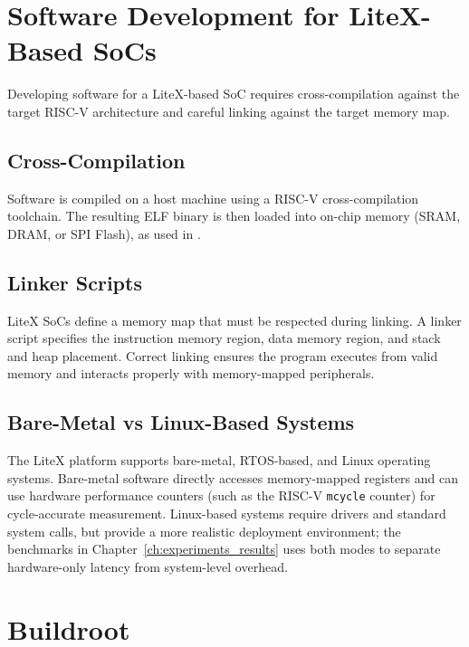 \section{Software Development for LiteX-Based SoCs}
\label{sec:sw_dev}

Developing software for a LiteX-based SoC requires cross-compilation against the
target RISC-V architecture and careful linking against the target memory map.

\subsection{Cross-Compilation}
\label{subsec:cross_compile}

Software is compiled on a host machine using a RISC-V cross-compilation toolchain.
The resulting ELF binary is then loaded into on-chip memory (SRAM, DRAM, or SPI Flash),
as used in \cite{CXUPlayground}.

\subsection{Linker Scripts}
\label{subsec:linker_scripts}

LiteX SoCs define a memory map that must be respected during linking.
A linker script specifies the instruction memory region, data memory region, and stack
and heap placement.
Correct linking ensures the program executes from valid memory and interacts properly
with memory-mapped peripherals.

\subsection{Bare-Metal vs Linux-Based Systems}
\label{subsec:baremetal_linux}

The LiteX platform supports bare-metal, RTOS-based, and Linux operating systems.
Bare-metal software directly accesses memory-mapped registers and can use hardware
performance counters (such as the RISC-V \texttt{mcycle} counter) for cycle-accurate
measurement.
Linux-based systems require drivers and standard system calls, but provide a more
realistic deployment environment; the benchmarks in
Chapter~\ref{ch:experiments_results} uses both modes to separate hardware-only
latency from system-level overhead.

\section{Buildroot}
\label{sec:buildroot}

